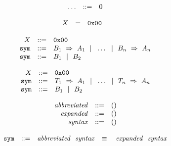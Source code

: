 \vspace{1ex}

$$
\begin{array}[t]{@{}lrrl@{}l@{}}
& \ldots & ::= & 0 \\
\end{array}
$$

$$
\begin{array}[t]{@{}lcl@{}l@{}}
X & = & \mathtt{0x00} \\
\end{array}
$$

$$
\begin{array}[t]{@{}lrrl@{}l@{}l@{}l@{}}
& X & ::= & \mathtt{0x00} \\
& {\mathtt{sym}} & ::= & B_1 ~\Rightarrow~ A_1 ~~|~~ \ldots ~~|~~ B_n ~\Rightarrow~ A_n \\
& {\mathtt{sym}} & ::= & B_1 ~~|~~ B_2 \\
\end{array}
$$

\vspace{1ex}

\vspace{1ex}

$$
\begin{array}[t]{@{}lrrl@{}l@{}l@{}l@{}}
& X & ::= & \mathtt{0x00} \\
& {\mathtt{sym}} & ::= & T_1 ~\Rightarrow~ A_1 ~~|~~ \ldots ~~|~~ T_n ~\Rightarrow~ A_n \\
& {\mathtt{sym}} & ::= & B_1 ~~|~~ B_2 \\
\end{array}
$$

$$
\begin{array}[t]{@{}lrrl@{}l@{}}
& {\mathit{abbreviated}} & ::= & () \\
& {\mathit{expanded}} & ::= & () \\
& {\mathit{syntax}} & ::= & () \\
\end{array}
$$

$$
\begin{array}[t]{@{}lrrl@{}l@{}l@{}l@{}}
& {\mathtt{sym}} & ::= & {\mathit{abbreviated}}~~{\mathit{syntax}} & \quad\equiv\quad{} & {\mathit{expanded}}~~{\mathit{syntax}} \\
\end{array}
$$


